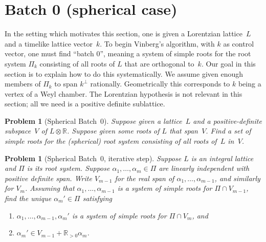 \documentclass[12pt]{amsart}
\def\R{\mathbb{R}}
\def\tensor{\otimes}
\numberwithin{theorem}{section}
\numberwithin{equation}{section}
\numberwithin{figure}{section}
\newtheorem{problem}[theorem]{Problem}
\theoremstyle{remark}
\begin{document}
\section{Batch 0 (spherical case)}
\label{SecBatchZero}

\noindent
In the setting which motivates this section, 
one is given a Lorentzian lattice~$L$ and a timelike 
lattice vector~$k$.   
To begin
Vinberg's algorithm, with $k$ as control vector, one must find
``batch 0'', meaning a 
system of simple roots for the root system
$\Pi_k$ consisting of all roots of $L$ that are orthogonal to~$k$.
Our goal in this section is to explain how to do this systematically.
We assume given enough members of $\Pi_k$ to span $k^\perp$
rationally.  
Geometrically
this corresponds to $k$ being a vertex of 
a Weyl chamber.   
The Lorentzian hypothesis is not relevant in this section;
all we need is a positive definite sublattice.

\begin{problem}[Spherical Batch~$0$]
	\label{ProbSphericalBatchZero}
	Suppose given  a lattice~$L$ and 
	 a positive-definite 
	subspace~$V$ of $L\tensor\R$.  Suppose
    given some roots of $L$ that span~$V$. 
	Find a set of simple roots for the 
	(spherical) root system consisting of all roots of~$L$ in~$V$.
\end{problem}

\begin{problem}[Spherical Batch~$0$, iterative step]
    \label{ProbSphericalBatchZeroIterative}
    Suppose $L$ is an integral lattice and $\Pi$ is its root 
    system.  Suppose  $\alpha_1,\dots,\alpha_{m}\in\Pi$ are linearly
    independent with positive definite span.
    Write $V_{m-1}$ for the real span of $\alpha_1,\dots,\alpha_{m-1}$, and similarly for $V_m$.
    Assuming that $\alpha_1,\dots,\alpha_{m-1}$ is a system of simple roots for $\Pi\cap V_{m-1}$,
    find the unique $\alpha_m'\in\Pi$ satisfying
    \begin{enumerate}
    \item
        \label{ProbIterativeSimpleExtension}
        $\alpha_1,\dots,\alpha_{m-1},\alpha_m'$ is a system of simple roots for $\Pi\cap V_m$, and
    \item
        \label{ProbIterativeSignDeterminer}
        $\alpha_m'\in V_{m-1}+\R_{>0}\alpha_m$.
    \end{enumerate}
\end{problem}
\end{document}
